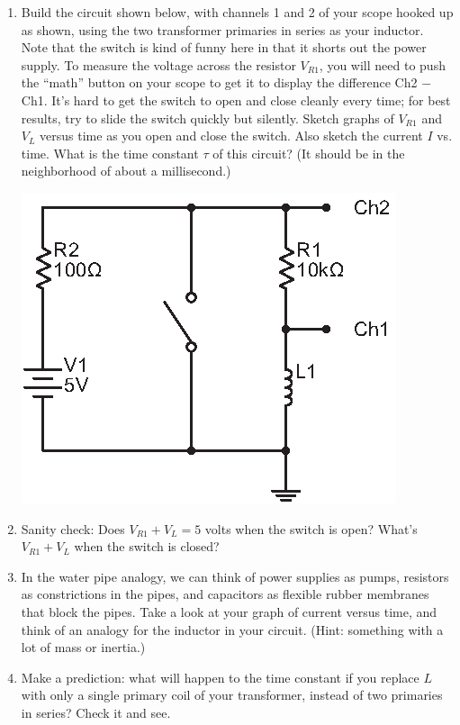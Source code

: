\begin{enumerate}[wide]
\item Build the circuit shown below, with channels 1 and 2 of your scope hooked up as shown, using the two transformer primaries in series as your inductor.  Note that the switch is kind of funny here in that it shorts out the power supply.  To measure the voltage across the resistor $V_{R1}$, you will need to push the ``math'' button on your scope to get it to display the difference Ch2 $-$ Ch1.  It's hard to get the switch to open and close cleanly every time; for best results, try to slide the switch quickly but silently.  Sketch graphs of $V_{R1}$ and $V_L$ versus time as you open and close the switch.   Also sketch the current $I$ vs. time.  What is the time constant $\tau$ of this circuit?  (It should be in the neighborhood of about a millisecond.)  \label{part_rl_constant}
\begin{center}
\includegraphics{inductors/single_dc_inductor.eps}
\end{center}

\item Sanity check: Does $V_{R1} +V_L = 5$ volts when the switch is open?  What's $V_{R1} +V_L$ when the switch is closed?

\item In the water pipe analogy, we can think of power supplies as pumps, resistors as constrictions in the pipes, and capacitors as flexible rubber membranes that block the pipes.  Take a look at your graph of current versus time, and think of an analogy for the inductor in your circuit.  (Hint: something with a lot of mass or inertia.)

\item Make a prediction: what will happen to the time constant if you replace $L$ with only a single primary coil of your transformer, instead of two primaries in series?  Check it and see.    


\end{enumerate}
